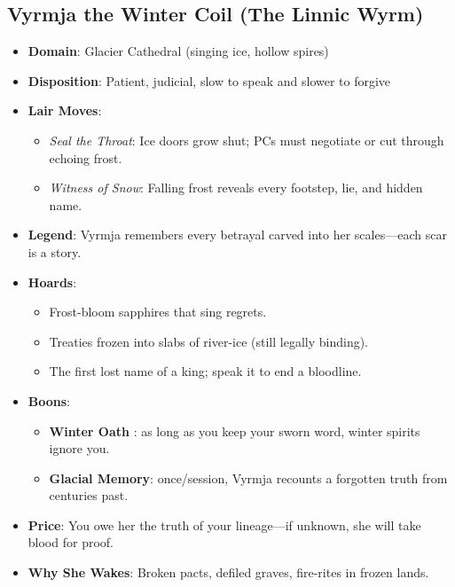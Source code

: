 \documentclass[11pt,letterpaper]{article}
\begin{document}
\subsection{Vyrmja the Winter Coil (The Linnic Wyrm)}
\begin{itemize}
\item \textbf{Domain}: Glacier Cathedral (singing ice, hollow spires)
\item \textbf{Disposition}: Patient, judicial, slow to speak and slower to forgive
\item \textbf{Lair Moves}: 
  \begin{itemize}
  \item \emph{Seal the Throat}: Ice doors grow shut; PCs must negotiate or cut through echoing frost.
  \item \emph{Witness of Snow}: Falling frost reveals every footstep, lie, and hidden name.
  \end{itemize}
\item \textbf{Legend}: Vyrmja remembers every betrayal carved into her scales---each scar is a story.
\item \textbf{Hoards}: 
  \begin{itemize}
  \item Frost-bloom sapphires that sing regrets.
  \item Treaties frozen into slabs of river-ice (still legally binding).
  \item The first lost name of a king; speak it to end a bloodline.
  \end{itemize}
\item \textbf{Boons}: 
  \begin{itemize}
  \item \textbf{Winter Oath} : as long as you keep your sworn word, winter spirits ignore you.
  \item \textbf{Glacial Memory}: once/session, Vyrmja recounts a forgotten truth from centuries past.
  \end{itemize}
\item \textbf{Price}: You owe her the truth of your lineage---if unknown, she will take blood for proof.
\item \textbf{Why She Wakes}: Broken pacts, defiled graves, fire-rites in frozen lands.
\end{itemize}

\end{document}
